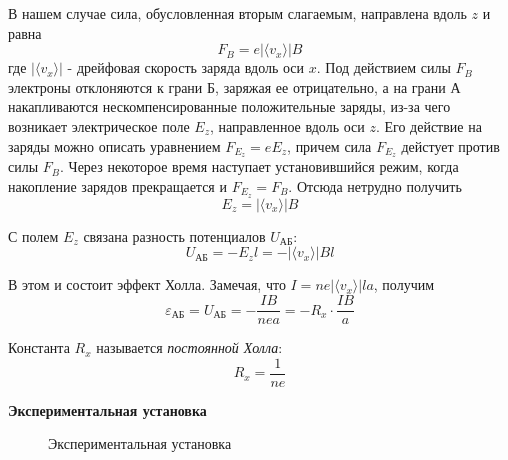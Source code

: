 \documentclass[14pt]{article}
\begin{document}
В нашем случае сила, обусловленная вторым слагаемым, направлена вдоль $z$ и равна 
$$
	F_B = e|\langle v_x\rangle|B
$$
\noindent где $|\langle v_x\rangle|$ - дрейфовая скорость заряда вдоль оси $x$. Под действием силы $F_B$ электроны отклоняются к грани 
$\text{Б}$, заряжая ее отрицательно, а на грани А накапливаются нескомпенсированные положительные заряды, из-за чего возникает электрическое поле $E_z$, направленное вдоль оси $z$. Его действие на заряды можно описать уравнением $F_{E_z} = eE_z$, причем сила $F_{E_z}$ дейстует против силы $F_B$. Через некоторое время наступает установившийся режим, когда накопление зарядов прекращается и $F_{E_z} = F_B$. Отсюда нетрудно получить
$$
	E_z = |\langle v_x\rangle|B
$$

С полем $E_z$ связана разность потенциалов $U_{\text{АБ}}$:
$$
	U_{\text{АБ}} = -E_zl = -|\langle v_x\rangle|Bl
$$

В этом и состоит эффект Холла. Замечая, что $I = ne|\langle v_x\rangle|la$, получим
$$
	\varepsilon_{\text{АБ}} = U_{\text{АБ}} = -\frac{IB}{nea} = -R_x\cdot\frac{IB}{a}
$$

Константа $R_x$ называется \textsl{постоянной Холла}:
$$
	R_x = \frac{1}{ne}
$$

\vspace{1cm}
\textbf{Экспериментальная установка} 

\begin{figure}[h!]
	\caption{Экспериментальная установка}
	\label{fig:image}
\end{figure}
\end{document}
